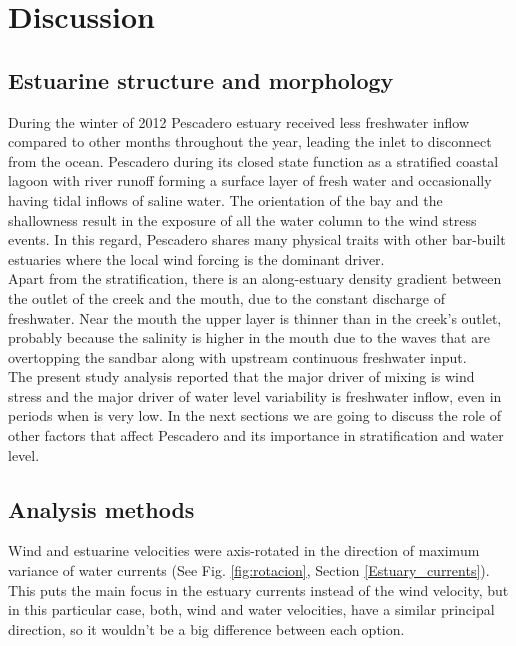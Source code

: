 \documentclass[tesis.tex]{subfiles}
\begin{document}
    
\section{Discussion}

\subsection{Estuarine structure and morphology}

During the winter of 2012 Pescadero estuary received less freshwater inflow compared to other months throughout the year, leading the inlet to disconnect from the ocean. Pescadero during its closed state function as a stratified coastal lagoon with river runoff forming a surface layer of fresh water and occasionally having tidal inflows of saline water. The orientation of the bay and the shallowness result in the exposure of all the water column to the wind stress events. In this regard, Pescadero shares many physical traits with other bar-built estuaries where the local wind forcing is the dominant driver.\\

Apart from the stratification, there is an along-estuary density gradient between the outlet of the creek and the mouth, due to the constant discharge of freshwater. Near the mouth the upper layer is thinner than in the creek's outlet, probably because the salinity is higher in the mouth due to the waves that are overtopping the sandbar along with upstream continuous freshwater input.\\

The present study analysis reported that the major driver of mixing is wind stress and the major driver of water level variability is freshwater inflow, even in periods when is very low. In the next sections we are going to discuss the role of other factors that affect Pescadero and its importance in stratification and water level.\\

\subsection{Analysis methods}

Wind and estuarine velocities were axis-rotated in the direction of maximum variance of water currents (See Fig. \ref{fig:rotacion}, Section \ref{Estuary_currents}). This puts the main focus in the estuary currents instead of the wind velocity, but in this particular case, both, wind and water velocities, have a similar principal direction, so it wouldn't be a big difference between each option.\\
\end{document}

